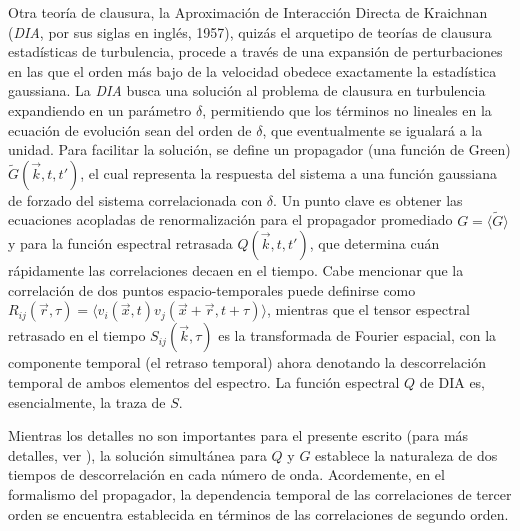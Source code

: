 Otra teoría de clausura, la Aproximación de Interacción Directa de
Kraichnan (\textit{DIA}, por sus siglas en inglés, 1957), quizás el
arquetipo de teorías de clausura estadísticas de turbulencia, procede
a través de una expansión de perturbaciones en las que el orden más
bajo de la velocidad obedece exactamente la estadística gaussiana. La
\textit{DIA} busca una solución al problema de clausura en turbulencia
expandiendo en un parámetro $\delta$, permitiendo que los términos no
lineales en la ecuación de evolución sean del orden de $\delta$, que
eventualmente se igualará a la unidad. Para facilitar la solución, se
define un propagador (una función de Green) $\tilde{G}(\vec{k}, t,
t')$, el cual representa la respuesta del sistema a una función
gaussiana de forzado del sistema correlacionada con $\delta$. Un punto
clave es obtener las ecuaciones acopladas de renormalización para el
propagador promediado $G = \langle\tilde{G}\rangle$ y para la función
espectral retrasada $Q(\vec{k}, t, t')$, que determina cuán
rápidamente las correlaciones decaen en el tiempo. Cabe mencionar que
la correlación de dos puntos espacio-temporales puede definirse como
$R_{ij}(\vec{r}, \tau) = \langle v_i(\vec{x}, t) v_j(\vec{x}+\vec{r},
t+\tau)\rangle$, mientras que el tensor espectral retrasado en el
tiempo $S_{ij}(\vec{k},\tau)$ es la transformada de Fourier espacial,
con la componente temporal (el retraso temporal) ahora denotando la
descorrelación temporal de ambos elementos del espectro. La función
espectral $Q$ de DIA es, esencialmente, la traza de $S$.

Mientras los detalles no son importantes para el presente escrito
(para más detalles, ver
\cite{leslie_developments_1973, mccomb_physics_1990}), la solución
simultánea para $Q$ y $G$ establece la naturaleza de dos tiempos de
descorrelación en cada número de onda. Acordemente, en el formalismo
del propagador, la dependencia temporal de las correlaciones de tercer
orden se encuentra establecida en términos de las correlaciones de
segundo orden.


